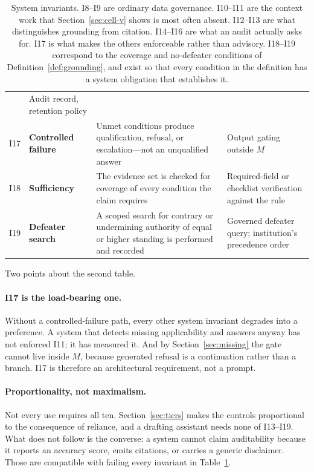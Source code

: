 \begin{table}[ht]
\begin{tabular}{@{}>{\raggedright\arraybackslash}p{0.7cm}>{\raggedright\arraybackslash}p{3.3cm}>{\raggedright\arraybackslash}p{4.6cm}>{\raggedright\arraybackslash}p{4.4cm}@{}}
       & Audit record, retention policy \\
    \addlinespace
    I17 & \textbf{Controlled failure}
       & Unmet conditions produce qualification, refusal, or escalation---not an
         unqualified answer
       & Output gating outside $M$ \\
    \addlinespace
    I18 & \textbf{Sufficiency}
       & The evidence set is checked for coverage of every condition the claim requires
       & Required-field or checklist verification against the rule \\
    \addlinespace
    I19 & \textbf{Defeater search}
       & A scoped search for contrary or undermining authority of equal or higher
         standing is performed and recorded
       & Governed defeater query; institution's precedence order \\
    \bottomrule
  \end{tabular}
  \caption{System invariants. I8--I9 are ordinary data governance. I10--I11 are the
    context work that Section~\ref{sec:cell-v} shows is most often absent.
    I12--I13 are what distinguishes grounding from citation. I14--I16 are what an
    audit actually asks for. I17 is what makes the others enforceable rather than
    advisory. I18--I19 correspond to the coverage and no-defeater conditions of
    Definition~\ref{def:grounding}, and exist so that every condition in the definition
    has a system obligation that establishes it.}
  \label{tab:invariants-system}
\end{table}

Two points about the second table.

\paragraph{I17 is the load-bearing one.} Without a controlled-failure path, every
other system invariant degrades into a preference. A system that detects missing
applicability and answers anyway has not enforced I11; it has measured it. And by
Section~\ref{sec:missing} the gate cannot live inside $M$, because generated
refusal is a continuation rather than a branch. I17 is therefore an architectural
requirement, not a prompt.

\paragraph{Proportionality, not maximalism.} Not every use requires all ten.
Section~\ref{sec:tiers} makes the controls proportional to the consequence of
reliance, and a drafting assistant needs none of I13--I19. What does not follow is
the converse: a system cannot claim auditability because it reports an accuracy
score, emits citations, or carries a generic disclaimer. Those are compatible with
failing every invariant in Table~\ref{tab:invariants-system}.
